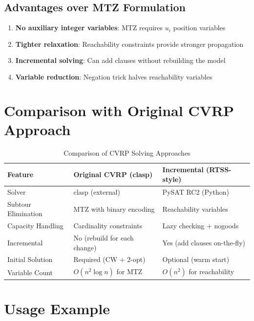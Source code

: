 \documentclass[12pt,a4paper]{article}
\theoremstyle{definition}
\begin{document}
\subsection{Advantages over MTZ Formulation}

\begin{enumerate}
    \item \textbf{No auxiliary integer variables}: MTZ requires $u_i$ position variables
    \item \textbf{Tighter relaxation}: Reachability constraints provide stronger propagation
    \item \textbf{Incremental solving}: Can add clauses without rebuilding the model
    \item \textbf{Variable reduction}: Negation trick halves reachability variables
\end{enumerate}

\section{Comparison with Original CVRP Approach}

\begin{table}[H]
\centering
\begin{tabular}{|l|p{5cm}|p{5cm}|}
\hline
\textbf{Feature} & \textbf{Original CVRP (clasp)} & \textbf{Incremental (RTSS-style)} \\
\hline
Solver & clasp (external) & PySAT RC2 (Python) \\
\hline
Subtour Elimination & MTZ with binary encoding & Reachability variables \\
\hline
Capacity Handling & Cardinality constraints & Lazy checking + nogoods \\
\hline
Incremental & No (rebuild for each change) & Yes (add clauses on-the-fly) \\
\hline
Initial Solution & Required (CW + 2-opt) & Optional (warm start) \\
\hline
Variable Count & $O(n^2 \log n)$ for MTZ & $O(n^2)$ for reachability \\
\hline
\end{tabular}
\caption{Comparison of CVRP Solving Approaches}
\end{table}

\section{Usage Example}
\end{document}
